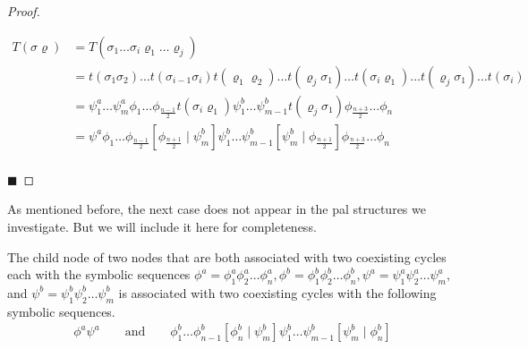 \begin{proof}
\begin{enumerate}
		      \begin{align*}
			      T(\sigma\varrho) & = T(\sigma_1 \dots \sigma_i \varrho_1 \dots \varrho_j)                                                                                                   \\
			                       & =
			      t(\sigma_1\sigma_2) \dots t(\sigma_{i-1}\sigma_i) t(\varrho_1\varrho_2) \dots t(\varrho_j \sigma_1) \dots t(\sigma_i\varrho_1) \dots t(\varrho_j\sigma_1) \dots t(\sigma_i) \\
			                       & =
			      \psi^a_1 \dots \psi^a_m
			      \phi_1 \dots \phi_{\frac{n-1}{2}} t(\sigma_i \varrho_1)
			      \psi^b_1 \dots \psi^b_{m-1} t(\varrho_j \sigma_1)
			      \phi_{\frac{n+3}{2}} \dots \phi_n                                                                                                                                           \\
			                       & =
			      \psi^a
			      \phi_1 \dots \phi_{\frac{n-1}{2}} \left[\phi_{\frac{n+1}{2}} \mid \psi^b_m\right]
			      \psi^b_1 \dots \psi^b_{m-1} \left[\psi^b_m \mid \phi_{\frac{n+1}{2}}\right]
			      \phi_{\frac{n+3}{2}} \dots \phi_n                                                                                                                                           \\
		      \end{align*}
	\end{enumerate}
	\hfill $\blacksquare$
\end{proof}

As mentioned before, the next case does not appear in the \gls{pal} structures we investigate.
But we will include it here for completeness.

\begin{theorem}
	\label{theorem:child.symbolic.3}
	The child node of two nodes that are both associated with two coexisting cycles each with the symbolic sequences $\phi^a = \phi^a_1\phi^a_2\dots\phi^a_n, \phi^b = \phi^b_1\phi^b_2\dots\phi^b_n, \psi^a = \psi^a_1\psi^a_2\dots\psi^a_m,$ and $\psi^b = \psi^b_1\psi^b_2\dots\psi^b_m$ is associated with two coexisting cycles with the following symbolic sequences.
	\begin{align}
		\phi^a\psi^a \qquad \text{and} \qquad
		\phi^b_1 \dots \phi^b_{n-1} \left[\phi^b_n \mid \psi^b_m\right] \psi^b_1 \dots \psi^b_{m-1} \left[\psi^b_m \mid \phi^b_n\right]
	\end{align}
\end{theorem}

